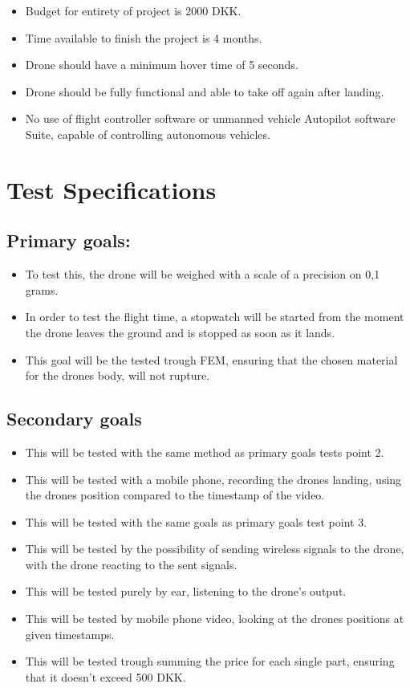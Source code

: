 \begin{itemize}
    \item
          Budget for entirety of project is 2000 DKK.
    \item
          Time available to finish the project is 4 months.
    \item
          Drone should have a minimum hover time of 5 seconds.
    \item
          Drone should be fully functional and able to take off again after landing.
    \item
          No use of flight controller software or unmanned vehicle Autopilot software Suite, capable of controlling autonomous vehicles.
\end{itemize}


\section {Test Specifications}
\subsection{Primary goals:}
\begin{itemize}
    \item
          To test this, the drone will be weighed with a scale of a precision on 0,1 grams.
    \item
          In order to test the flight time, a stopwatch will be started from the moment the drone leaves the ground and is stopped as soon as it lands.
    \item
          This goal will be the tested trough FEM, ensuring that the chosen material for the drones body, will not rupture.
\end{itemize}

\subsection{Secondary goals}
\begin{itemize}
    \item
          This will be tested with the same method as primary goals tests point 2.
    \item
          This will be tested with a mobile phone, recording the drones landing, using the drones position compared to the timestamp of the video.
    \item
          This will be tested with the same goals as primary goals test point 3.
    \item
          This will be tested by the possibility of sending wireless signals to the drone, with the drone reacting to the sent signals.
    \item
          This will be tested purely by ear, listening to the drone's output.
    \item
          This will be tested by mobile phone video, looking at the drones positions at given timestamps.
    \item
          This will be tested trough summing the price for each single part, ensuring that it doesn’t exceed 500 DKK.
\end{itemize}

